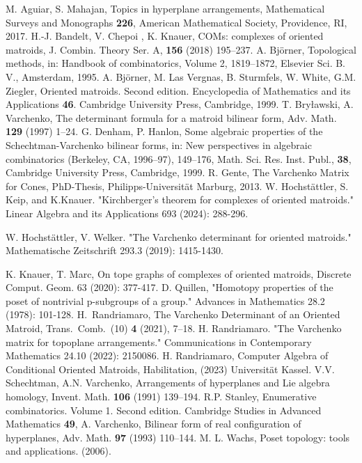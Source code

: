 \documentclass[12pt]{amsart}
\theoremstyle{plain}
\numberwithin{Lemma}{\DefaultNumberTheoremWithin}
\numberwithin{Claim}{\DefaultNumberTheoremWithin}
\numberwithin{Theorem}{\DefaultNumberTheoremWithin}
\numberwithin{Corollary}{\DefaultNumberTheoremWithin}
\numberwithin{Proposition}{\DefaultNumberTheoremWithin}
\numberwithin{Conjecture}{\DefaultNumberTheoremWithin}
\numberwithin{Situation}{\DefaultNumberTheoremWithin}
\numberwithin{Note}{\DefaultNumberTheoremWithin}
\theoremstyle{definition}
\numberwithin{Definition}{\DefaultNumberTheoremWithin}
\theoremstyle{definition}
\numberwithin{Question}{\DefaultNumberTheoremWithin}
\theoremstyle{definition}
\numberwithin{Problem}{\DefaultNumberTheoremWithin}
\theoremstyle{remark} \newtheorem{Remark}{Remark}
\numberwithin{Remark}{\DefaultNumberTheoremWithin}
\theoremstyle{remark}
\numberwithin{Example}{\DefaultNumberTheoremWithin}
\numberwithin{Case}{Lemma}
\numberwithin{Step}{Lemma}
\begin{document}
\begin{thebibliography}{xxx}
      M. Aguiar, S. Mahajan, 
      Topics in hyperplane arrangements, 
      Mathematical Surveys and Monographs {\bf 226},
      American Mathematical Society, Providence, RI, 2017. 
     H.-J. Bandelt, V. Chepoi , K. Knauer,  
     COMs: complexes of oriented matroids,
     J. Combin. Theory Ser. A, {\bf 156} (2018) 195--237. 
     A. Bj\"orner, Topological methods, in: Handbook of combinatorics, Volume 2, 1819--1872, Elsevier Sci. B. V., Amsterdam, 1995. 
      A. Bj\"orner, M. Las Vergnas, B. Sturmfels, W. White, G.M. Ziegler,
     Oriented matroids. Second edition. Encyclopedia of Mathematics and its
     Applications {\bf 46}. Cambridge University Press, Cambridge, 1999.
     T. Bry\l awski, A. Varchenko, 
     The determinant formula for a matroid bilinear form, 
     Adv. Math. {\bf 129} (1997) 1--24. 
      G. Denham, P. Hanlon,
      Some algebraic properties of the Schechtman-Varchenko bilinear forms, 
      in: New perspectives in algebraic combinatorics (Berkeley, CA, 1996–97), 
      149--176, Math. Sci. Res. Inst. Publ., {\bf 38}, Cambridge University Press, Cambridge, 
      1999.
      R. Gente, 
      The Varchenko Matrix for Cones, 
      PhD-Thesis, Philipps-Universit\"at Marburg, 2013.
  	W. Hochstättler, S. Keip, and K.Knauer. "Kirchberger's theorem for complexes of oriented matroids." Linear Algebra and its Applications 693 (2024): 288-296.    
  
  	W. Hochst\"attler, V. Welker. "The Varchenko determinant for oriented matroids." Mathematische Zeitschrift 293.3 (2019): 1415-1430.    
  
     K. Knauer,  T. Marc,
     On tope graphs of complexes of oriented matroids,
     Discrete Comput. Geom. 63 (2020): 377-417.
 D. Quillen,  "Homotopy properties of the poset of nontrivial p-subgroups of a group." Advances in Mathematics 28.2 (1978): 101-128. 
      H.\ Randriamaro, 
      The Varchenko Determinant of an Oriented  Matroid,
      Trans.\ Comb.\ (10) {\bf 4} (2021), 7--18.
H. Randriamaro. "The Varchenko matrix for topoplane arrangements." Communications in Contemporary Mathematics 24.10 (2022): 2150086.
 H. 	Randriamaro, Computer Algebra of Conditional Oriented Matroids, Habilitation, (2023)
Universität Kassel.    
      V.V. Schechtman, A.N. Varchenko, 
      Arrangements of hyperplanes and Lie algebra homology,
      Invent. Math. {\bf 106} (1991) 139--194. 
     R.P. Stanley,
      Enumerative combinatorics. Volume 1. 
      Second edition. Cambridge Studies in Advanced Mathematics {\bf 49},
     A. Varchenko, 
     Bilinear form of real configuration of hyperplanes,
     Adv. Math. {\bf 97} (1993) 110--144. 
	M. L. Wachs, Poset topology: tools and applications.  (2006).
\end{thebibliography}
\end{document}
